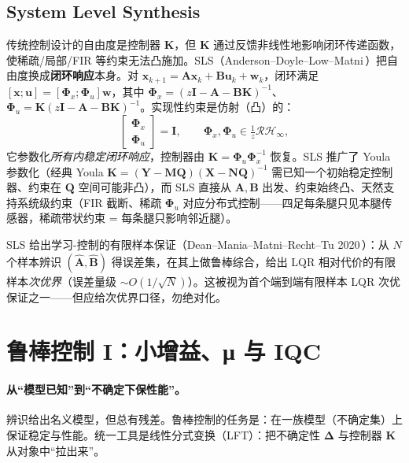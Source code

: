 \subsection{System Level Synthesis}
传统控制设计的自由度是控制器 $\mathbf K$，但 $\mathbf K$ 通过反馈非线性地影响闭环传递函数，使稀疏/局部/FIR 等约束无法凸施加。SLS（Anderson--Doyle--Low--Matni\,\cite{anderson2019sls}）把自由度换成\textbf{闭环响应}本身。对 $\mathbf x_{k+1}=\mathbf A\mathbf x_k+\mathbf B\mathbf u_k+\mathbf w_k$，闭环满足 $[\mathbf x;\mathbf u]=[\boldsymbol\Phi_x;\boldsymbol\Phi_u]\mathbf w$，其中 $\boldsymbol\Phi_x=(z\mathbf I-\mathbf A-\mathbf B\mathbf K)^{-1}$、$\boldsymbol\Phi_u=\mathbf K(z\mathbf I-\mathbf A-\mathbf B\mathbf K)^{-1}$。实现性约束是仿射（凸）的：
\begin{equation}
  [z\mathbf I-\mathbf A,\ -\mathbf B]\begin{bmatrix}\boldsymbol\Phi_x\\\boldsymbol\Phi_u\end{bmatrix}=\mathbf I,
  \qquad \boldsymbol\Phi_x,\boldsymbol\Phi_u\in\tfrac1z\mathcal{RH}_\infty,
  \label{eq:sls-affine}
\end{equation}
它参数化\emph{所有内稳定闭环响应}，控制器由 $\mathbf K=\boldsymbol\Phi_u\boldsymbol\Phi_x^{-1}$ 恢复。SLS 推广了 Youla 参数化（经典 Youla $\mathbf K=(\mathbf Y-\mathbf M\mathbf Q)(\mathbf X-\mathbf N\mathbf Q)^{-1}$ 需已知一个初始稳定控制器、约束在 $\mathbf Q$ 空间可能非凸），而 SLS 直接从 $\mathbf A,\mathbf B$ 出发、约束始终凸、天然支持系统级约束（FIR 截断、稀疏 $\boldsymbol\Phi_u$ 对应分布式控制——四足每条腿只见本腿传感器，稀疏带状约束 = 每条腿只影响邻近腿）。

\begin{insight}
SLS 给出学习-控制的有限样本保证（Dean--Mania--Matni--Recht--Tu 2020\,\cite{dean2020sample}）：从 $N$ 个样本辨识 $(\hat{\mathbf A},\hat{\mathbf B})$ 得误差集，在其上做鲁棒综合，给出 LQR 相对代价的有限样本\emph{次优界}（误差量级 $\sim O(1/\sqrt N)$）。这被视为首个端到端有限样本 LQR 次优保证之一——但应给次优界口径，勿绝对化。
\end{insight}

\section{鲁棒控制 I：小增益、μ 与 IQC}
\label{sec:robust-mu}

\paragraph{从“模型已知”到“不确定下保性能”。}
辨识给出名义模型，但总有残差。鲁棒控制的任务是：在一族模型（不确定集）上保证稳定与性能。统一工具是线性分式变换（LFT）：把不确定性 $\boldsymbol\Delta$ 与控制器 $\mathbf K$ 从对象中“拉出来”。

